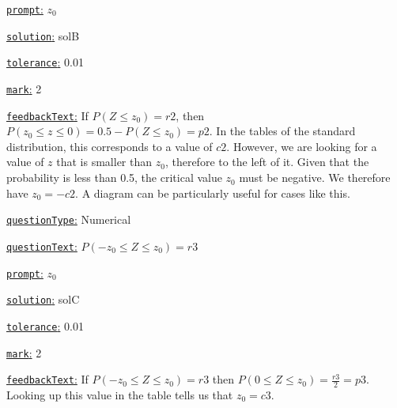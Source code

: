 \documentclass[preview]{standalone}
\newcommand \fieldname[1]{\underline{\texttt{#1}:}}
\begin{document}
\fieldname{prompt}
$z_0$

\fieldname{solution}
solB

\fieldname{tolerance}
0.01

\fieldname{mark}
2

\fieldname{feedbackText}
If $P(Z \le z_0) = {r2}$, then $P(z_0 \le z \le 0) = 0.5 - P(Z \le z_0) = {p2}$. In the tables of the standard distribution, this corresponds to a value of ${c2}$. However, we are looking for a value of $z$ that is smaller than $z_0$, therefore to the left of it. Given that the probability is less than 0.5, the critical value $z_0$ must be negative. We therefore have $z_0 = -{c2}$. A diagram can be particularly useful for cases like this.

\fieldname{questionType}
Numerical

\fieldname{questionText}
$P(-z_0 \le Z \le z_0) = {r3}$

\fieldname{prompt}
$z_0$

\fieldname{solution}
solC

\fieldname{tolerance}
0.01

\fieldname{mark}
2

\fieldname{feedbackText}
If $P(-z_0 \le Z \le z_0) = {r3}$ then $P(0 \le Z \le z_0) = \frac{{r3}}{2} = {p3}$. Looking up this value in the table tells us that $z_0 = {c3}$.

\end{document}
